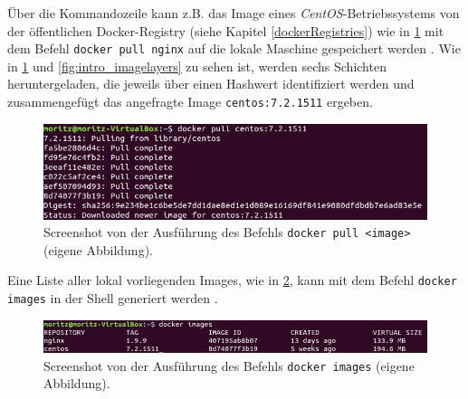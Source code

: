 \documentclass[../main.tex]{subfiles}
\begin{document}

      Über die Kommandozeile kann z.B. das Image eines \emph{CentOS}-Betriebssystems von der öffentlichen Docker-Registry (siehe Kapitel \ref{dockerRegistries}) wie in \fig \ref{fig:intro_dockerPull} mit dem Befehl \texttt{docker pull nginx} auf die lokale Maschine gespeichert werden \cite{dockerHubNginx}\cite{dockerPull}. Wie in \fig \ref{fig:intro_dockerPull} und \fig \ref{fig:intro_imagelayers} zu sehen ist, werden sechs Schichten heruntergeladen, die jeweils über einen Hashwert identifiziert werden und zusammengefügt das angefragte Image \texttt{centos:7.2.1511} ergeben.

			\begin{figure}[!htbp]
          \centering
          \includegraphics[width=1.0\textwidth]{./images/intro_dockerPull.jpg}
          \caption{Screenshot von der Ausführung des Befehls \texttt{docker pull <image>} (eigene Abbildung).}
          \label{fig:intro_dockerPull}
      \end{figure}

			Eine Liste aller lokal vorliegenden Images, wie in \fig \ref{fig:intro_dockerImages}, kann mit dem Befehl \texttt{docker images} in der \acrshort{Shell} generiert werden \cite{dockerImages}.

			\begin{figure}[!htbp]
          \centering
          \includegraphics[width=1.0\textwidth]{./images/intro_dockerImages.jpg}
          \caption{Screenshot von der Ausführung des Befehls \texttt{docker images} (eigene Abbildung).}
          \label{fig:intro_dockerImages}
      \end{figure}


\end{document}
